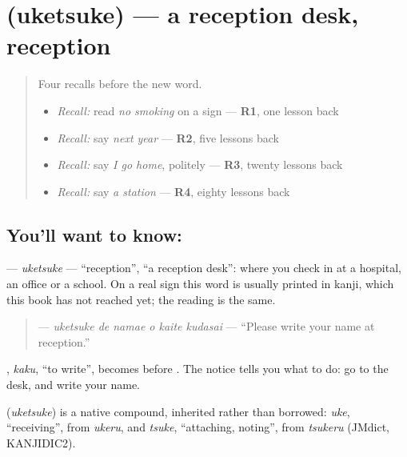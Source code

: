 \section[\texorpdfstring{\ja{うけつけ} (uketsuke)}{うけつけ (uketsuke)}]{ (uketsuke) — a reception desk, reception}

\label{lesson:JA-C142-uketsuke}



\begin{quote}
Four recalls before the new word.

\begin{itemize}
\raggedright
  \item \emph{Recall:} read \emph{no smoking} on a sign — \textbf{R1}, one lesson back
  \item \emph{Recall:} say \emph{next year} — \textbf{R2}, five lessons back
  \item \emph{Recall:} say \emph{I go home}, politely — \textbf{R3}, twenty lessons back
  \item \emph{Recall:} say \emph{a station} — \textbf{R4}, eighty lessons back
\end{itemize}
\end{quote}

\subsection*{You'll want to know: }
\textbf{} — \emph{uketsuke} — \textquotedblleft{}reception\textquotedblright{}, \textquotedblleft{}a reception desk\textquotedblright{}: where you check in at a hospital, an office or a school. On a real sign this word is usually printed in kanji, which this book has not reached yet; the reading is the same.

\begin{quote}
\textbf{   } — \emph{uketsuke de namae o kaite kudasai} — \textquotedblleft{}Please write your name at reception.\textquotedblright{}
\end{quote}

\textbf{}, \emph{kaku}, \textquotedblleft{}to write\textquotedblright{}, becomes \textbf{} before \textbf{}. The notice tells you what to do: go to the desk, and write your name.

\begin{cousinweb}
\textbf{} (\emph{uketsuke}) is a native compound, inherited rather than borrowed: \emph{uke}, \textquotedblleft{}receiving\textquotedblright{}, from \emph{ukeru}, and \emph{tsuke}, \textquotedblleft{}attaching, noting\textquotedblright{}, from \emph{tsukeru} (JMdict, KANJIDIC2).
\end{cousinweb}

